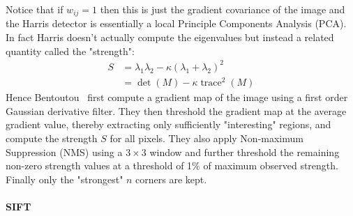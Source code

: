 Notice that if \(w_{ij} = 1\) then this is just the gradient covariance of the image and the Harris detector is essentially a local Principle Components Analysis (PCA).
%
In fact Harris doesn't actually compute the eigenvalues but instead a related quantity called the "strength":
\begin{align}
	S & = \lambda_1 \lambda_2 - \kappa (\lambda_1 + \lambda_2)^2 \\
	  & = \det(M) - \kappa \operatorname{trace}^2(M)
	\label{eqn:strength}
\end{align}
%
Hence Bentoutou \etal~first compute a gradient map of the image using a first order Gaussian derivative filter.
%
They then threshold the gradient map at the average gradient value, thereby extracting only sufficiently "interesting" regions, and compute the strength \(S\) for all pixels.
%
They also apply Non-maximum Suppression (NMS) using a \(3 \times 3\) window and further threshold the remaining non-zero strength values at a threshold of 1\% of maximum observed strength.
%
Finally only the "strongest" \(n\) corners are kept.

\paragraph{SIFT}


